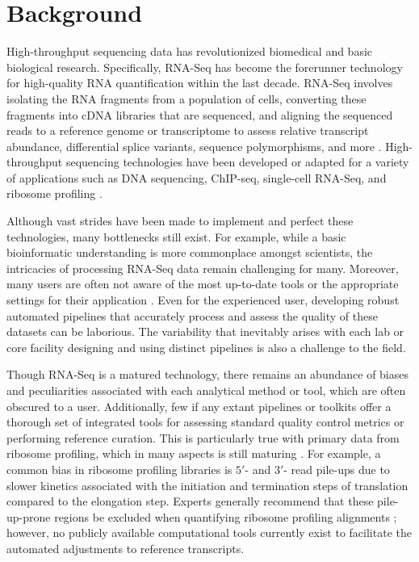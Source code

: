 \documentclass[10pt, oneside]{article}
\begin{document}
\section{Background}
High-throughput sequencing data has revolutionized biomedical and basic biological research. Specifically, RNA-Seq has become the forerunner technology for high-quality RNA quantification within the last decade. RNA-Seq involves isolating the RNA fragments from a population of cells, converting these fragments into cDNA libraries that are sequenced, and aligning the sequenced reads to a reference genome or transcriptome to assess relative transcript abundance, differential splice variants, sequence polymorphisms, and more \cite{byron_nrg}. High-throughput sequencing technologies have been developed or adapted for a variety of applications such as DNA sequencing, ChIP-seq, single-cell RNA-Seq, and ribosome profiling \cite{ingolia_science}. \par
Although vast strides have been made to implement and perfect these technologies, many bottlenecks still exist. For example, while a basic bioinformatic understanding is more commonplace amongst scientists, the intricacies of processing RNA-Seq data remain challenging for many. Moreover, many users are often not aware of the most up-to-date tools or the appropriate settings for their application \cite{costello_npjsba, funari_science}. Even for the experienced user, developing robust automated pipelines that accurately process and assess the quality of these datasets can be laborious. The variability that inevitably arises with each lab or core facility designing and using distinct pipelines is also a challenge to the field. \par

Though RNA-Seq is a matured technology, there remains an abundance of biases and peculiarities associated with each analytical method or tool, which are often obscured to a user. Additionally, few if any extant pipelines or toolkits offer a thorough set of integrated tools for assessing standard quality control metrics or performing reference curation. This is particularly true with primary data from ribosome profiling, which in many aspects is still maturing \cite{ingolia_meth}. For example, a common bias in ribosome profiling libraries is $5'$- and $3'$- read pile-ups \cite{gerashchenko_nar, artieri_gr, hussman_plosg} due to slower kinetics associated with the initiation and termination steps of translation compared to the elongation step. Experts generally recommend that these pile-up-prone regions be excluded when quantifying ribosome profiling alignments \cite{ingolia_meth, weinberg_reports}; however, no publicly available computational tools currently exist to facilitate the automated adjustments to reference transcripts. \par
\end{document}
